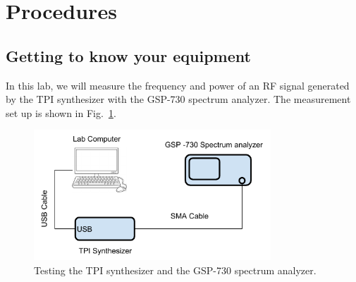 \documentclass[letterpaper, 11pt]{article}
\begin{document}
\newpage
\section{Procedures}

\subsection{Getting to know your equipment}
\label{sec:equipment}

In this lab, we will measure the frequency and power of an RF signal generated by the TPI synthesizer with the GSP-730 spectrum analyzer. The measurement set up is shown in Fig.~\ref{fig:setup-single-tone}.

\begin{figure}[h]
	\centering
	\includegraphics[width=3.5in]{setup-single-tone}
	\caption{Testing the TPI synthesizer and the GSP-730 spectrum analyzer.}
	\label{fig:setup-single-tone}
\end{figure}
\end{document}
